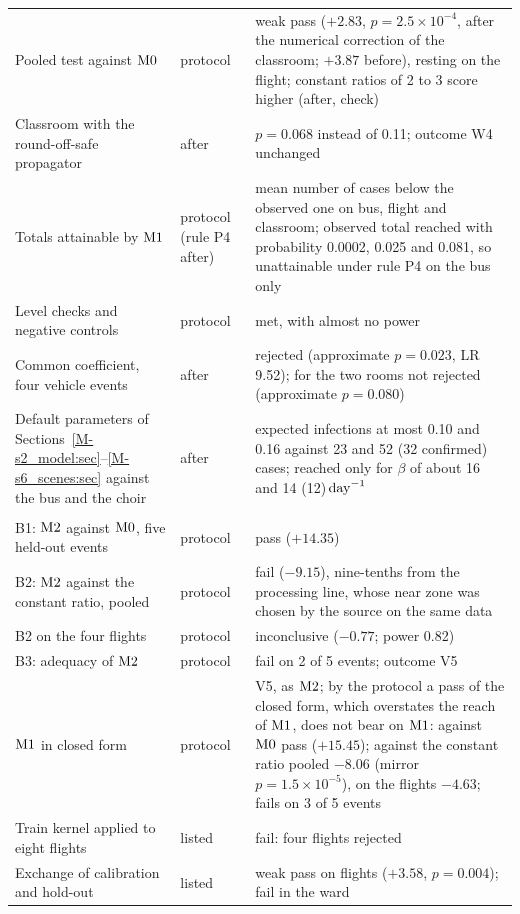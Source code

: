 {\begin{longtable}{@{}>{\raggedright}p{4.6cm}>{\raggedright}p{1.5cm}>{\raggedright\arraybackslash}p{9.4cm}@{}}
Pooled test against $\mathrm{M0}$ & protocol & weak pass ($+2.83$, $p=2.5\times10^{-4}$, after the numerical correction of the classroom; $+3.87$ before), resting on the flight; constant ratios of 2 to 3 score higher (after, check) \\
Classroom with the round-off-safe propagator & after & $p=0.068$ instead of 0.11; outcome W4 unchanged \\
Totals attainable by $\mathrm{M1}$ & protocol (rule P4 after) & mean number of cases below the observed one on bus, flight and classroom; observed total reached with probability 0.0002, 0.025 and 0.081, so unattainable under rule P4 on the bus only \\
Level checks and negative controls & protocol & met, with almost no power \\
Common coefficient, four vehicle events & after & rejected (approximate $p=0.023$, LR 9.52); for the two rooms not rejected (approximate $p=0.080$) \\
Default parameters of Sections~\ref{M-s2_model:sec}--\ref{M-s6_scenes:sec} against the bus and the choir & after & expected infections at most 0.10 and 0.16 against 23 and 52 (32 confirmed) cases; reached only for $\beta$ of about 16 and 14 (12)$\,\mathrm{day}^{-1}$ \\
\addlinespace
\multicolumn{3}{@{}l}{\emph{Second outbreak test (Section~\ref{M-s8_outbreaks:sec:second})}} \\
B1: $\mathrm{M2}$ against $\mathrm{M0}$, five held-out events & protocol & pass ($+14.35$) \\
B2: $\mathrm{M2}$ against the constant ratio, pooled & protocol & fail ($-9.15$), nine-tenths from the processing line, whose near zone was chosen by the source on the same data \\
B2 on the four flights & protocol & inconclusive ($-0.77$; power 0.82) \\
B3: adequacy of $\mathrm{M2}$ & protocol & fail on 2 of 5 events; outcome V5 \\
$\mathrm{M1}$ in closed form & protocol & V5, as $\mathrm{M2}$; by the protocol a pass of the closed form, which overstates the reach of $\mathrm{M1}$, does not bear on $\mathrm{M1}$: against $\mathrm{M0}$ pass ($+15.45$); against the constant ratio pooled $-8.06$ (mirror $p=1.5\times10^{-5}$), on the flights $-4.63$; fails on 3 of 5 events \\
Train kernel applied to eight flights & listed & fail: four flights rejected \\
Exchange of calibration and hold-out & listed & weak pass on flights ($+3.58$, $p=0.004$); fail in the ward \\

\end{longtable}}
